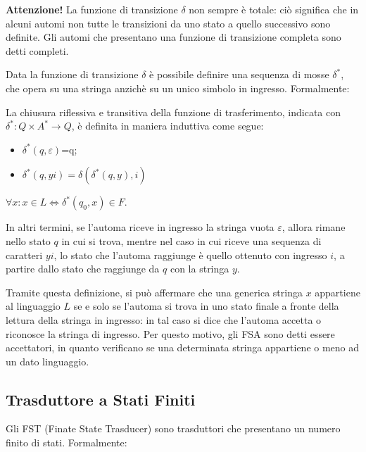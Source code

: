     \textbf{Attenzione!} La funzione di transizione \(\delta\) non sempre è totale: ciò significa che in alcuni automi non tutte le transizioni da uno stato a quello successivo sono definite. Gli automi che presentano una funzione di transizione completa sono detti completi.

    Data la funzione di transizione \(\delta\) è possibile definire una sequenza di mosse \(\delta^*\), che opera su una stringa anzichè su un unico simbolo in ingresso. Formalmente:

    \begin{definition}
      La chiusura riflessiva e transitiva della funzione di trasferimento, indicata con \(\delta^*:Q\times A^* \to Q\), è definita in maniera induttiva come segue:
      \begin{itemize}
        \item \(\delta^*(q,\varepsilon)\)=q;
        \item \(\delta^*(q,yi) = \delta(\delta^*(q,y), i)\)
      \end{itemize}
      \(\forall x : x \in L \Leftrightarrow \delta^*(q_0, x) \in F\).
    \end{definition}   

    In altri termini, se l'automa riceve in ingresso la stringa vuota \(\varepsilon\), allora rimane nello stato \(q\) in cui si trova, mentre nel caso in cui riceve una sequenza di caratteri \(yi\), lo stato che l'automa raggiunge è quello ottenuto con ingresso \(i\), a partire dallo stato che raggiunge da \(q\) con la stringa \(y\).
    
    Tramite questa definizione, si può affermare che una generica stringa \(x\) appartiene al linguaggio \(L\) se e solo se l'automa si trova in uno stato finale a fronte della lettura della stringa in ingresso: in tal caso si dice che l'automa accetta o riconosce la stringa di ingresso. Per questo motivo, gli FSA sono detti essere accettatori, in quanto verificano se una determinata stringa appartiene o meno ad un dato linguaggio.

    \subsection{Trasduttore a Stati Finiti}
    Gli FST (Finate State Trasducer) sono trasduttori che presentano un numero finito di stati. Formalmente:

